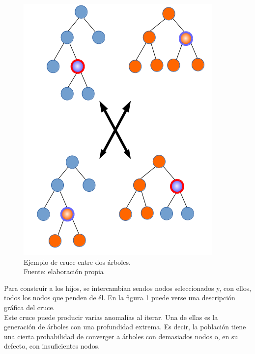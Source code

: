      	\begin{figure}[H]
    		\centering
    		\includegraphics[scale=0.6]{imagenes/crossover.png}
    	    \caption[Ejemplo de cruce entre dos \'arboles]{Ejemplo de cruce entre dos \'arboles.\\ Fuente: elaboraci\'on propia}
    		\label{fig:crossover}
	   \end{figure}

Para construir a los hijos, se intercambian sendos nodos seleccionados y, con ellos, todos los nodos que penden de \'el. En la figura \ref{fig:crossover} puede verse una descripci\'on gr\'afica del cruce.\\

Este cruce puede producir varias anomal\'ias al iterar. Una de ellas es la generaci\'on de \'arboles con una profundidad extrema. Es decir, la poblaci\'on tiene una cierta probabilidad de converger a \'arboles con demasiados nodos o, en su defecto, con insuficientes nodos.\\


